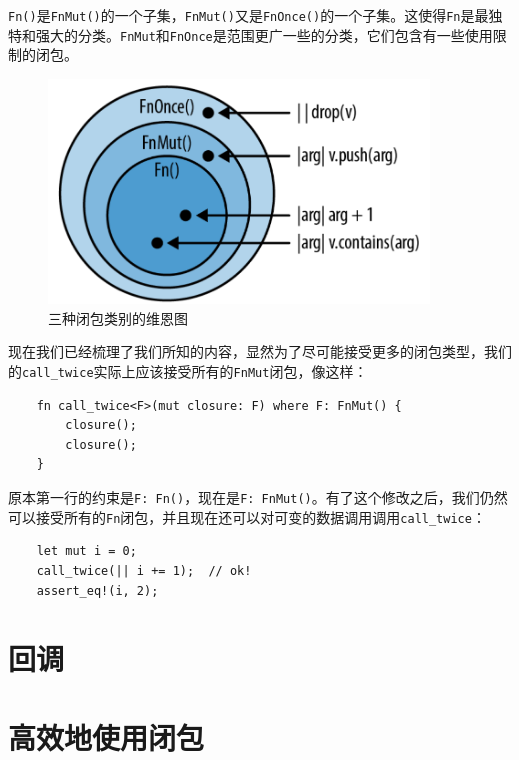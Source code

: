 \texttt{Fn()}是\texttt{FnMut()}的一个子集，\texttt{FnMut()}又是\texttt{FnOnce()}的一个子集。这使得\texttt{Fn}是最独特和强大的分类。\texttt{FnMut}和\texttt{FnOnce}是范围更广一些的分类，它们包含有一些使用限制的闭包。

\begin{figure}[htbp]
    \centering
    \includegraphics[width=0.9\textwidth]{../img/f14-2.png}
    \caption{三种闭包类别的维恩图}
    \label{f14-2}
\end{figure}

现在我们已经梳理了我们所知的内容，显然为了尽可能接受更多的闭包类型，我们的\texttt{call\_twice}实际上应该接受所有的\texttt{FnMut}闭包，像这样：
\begin{verbatim}
    fn call_twice<F>(mut closure: F) where F: FnMut() {
        closure();
        closure();
    }
\end{verbatim}

原本第一行的约束是\texttt{F: Fn()}，现在是\texttt{F: FnMut()}。有了这个修改之后，我们仍然可以接受所有的\texttt{Fn}闭包，并且现在还可以对可变的数据调用调用\texttt{call\_twice}：
\begin{verbatim}
    let mut i = 0;
    call_twice(|| i += 1);  // ok!
    assert_eq!(i, 2);
\end{verbatim}

\section{回调}\label{callback}

\section{高效地使用闭包}
